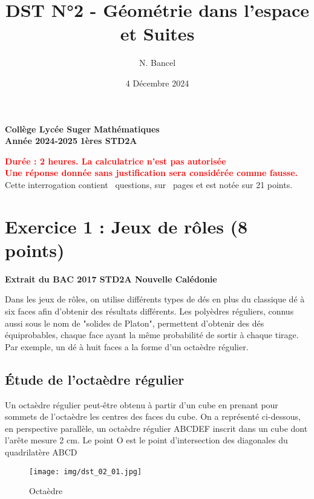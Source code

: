\documentclass{exam}
\title{DST N°2 - Géométrie dans l'espace et Suites}
\author{N. Bancel}
\date{4 Décembre 2024}
\begin{document}
\textbf{Collège Lycée Suger}
\hfill
\textbf{Mathématiques} \\

\textbf{Année 2024-2025}
\hfill
\textbf{1ères STD2A} \par

{\let\newpage\relax\maketitle}

\begin{center}
\textbf{\textcolor{red}{Durée : 2 heures. La calculatrice n'est pas autorisée}} \\
\textbf{\textcolor{red}{Une réponse donnée sans justification sera considérée comme fausse.}} \\
Cette interrogation contient \numquestions\ questions, sur \numpages\ pages et est notée sur 21 points. 

\end{center}

\section*{Exercice 1 : Jeux de rôles (8 points)}

\textbf{Extrait du BAC 2017 STD2A Nouvelle Calédonie} \par
\vspace{1em}
Dans les jeux de rôles, on utilise différents types de dés en plus du classique dé à six faces afin
d'obtenir des résultats différents. Les polyèdres réguliers, connus aussi sous le nom de "solides de
Platon", permettent d'obtenir des dés équiprobables, chaque face ayant la même probabilité de
sortir à chaque tirage. Par exemple, un dé à huit faces a la forme d'un octaèdre régulier.

\subsection*{Étude de l'octaèdre régulier}

Un octaèdre régulier peut-être obtenu à partir d'un cube en prenant pour sommets de l'octaèdre les centres des faces du cube.
On a représenté ci-dessous, en perspective parallèle, un octaèdre régulier ABCDEF inscrit dans un cube dont l'arête mesure 2 cm.
Le point O est le point d'intersection des diagonales du quadrilatère ABCD

\begin{figure}[H]
  \centering
  \texttt{[image: img/dst\_02\_01.jpg]}
  \caption{\label{} Octaèdre}
\end{figure}
\end{document}
